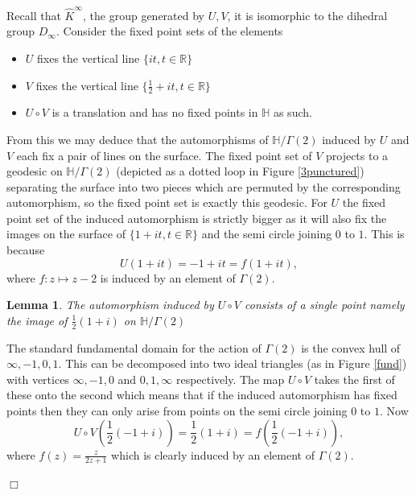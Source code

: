 \documentclass[12pt,a4paper]{amsart}
\newtheorem{lem}[thm]{Lemma}
\def\HH{\mathbb{H}}
\def\xx{\HH/g2}
\def\RR{\mathbb{R}}
\def\g2{\Gamma(2)}
\def\xx{\HH/\g2}
\begin{document}
Recall that  $\hat{K}^\infty$,  the group generated by $U,V$,
it is isomorphic to the dihedral group $D_\infty$.
Consider the fixed point sets of the elements
\begin{itemize}
\item $U$ fixes the  vertical line $\{ it, t \in \RR \} $
\item $V$ fixes the vertical line $\{ \frac{1}{2} +  it , t \in \RR \} $
\item $U\circ V$  is a translation and has no fixed points in $\HH$ as such.
\end{itemize}
From this we may deduce that the automorphisms of $\xx$ induced by $U$ and $V$ 
each fix a pair of lines on the surface. 
The fixed point set of  $V$ projects 
to a geodesic on $\xx$ (depicted as a dotted loop in Figure \ref{3punctured})
separating the surface
 into  two pieces which are permuted by 
the corresponding automorphism,
so the fixed point set is exactly this geodesic.
For $U$ the fixed point set of the induced automorphism  is strictly bigger 
as it will also fix  the images on the surface of 
$\{1+  it, t \in \RR \} $ and the semi circle joining $0$ to $1$.
This is because 
$$U(1+  it) = - 1+  it = f(1+  it),$$
where $f: z \mapsto z - 2$ is induced by an element of $\g2$.


\begin{lem}
The automorphism induced by $U\circ V$ consists of a single point
namely the image of $\frac{1}{2 }(1+ i)$ on $\xx$
\end{lem}

\proof The standard  fundamental domain for the action of $\g2$ 
is the convex hull of $\infty, -1, 0 , 1$.
This can be decomposed into two ideal triangles (as in Figure \ref{fund})
with vertices $\infty, -1, 0 $ and $ 0 , 1,\infty$ respectively.
The map  $U\circ V$ takes the first of these onto the second
which means that
if the induced automorphism has fixed points then 
they can only arise from points on the semi circle joining $0$ to $1$.
Now
$$U\circ V \left(\frac{1}{2 }(-1+ i) \right)  = \frac{1}{2 }(1+ i) = f \left(\frac{1}{2 }(-1+ i) \right),$$
where $f(z) = \frac{z}{2z + 1}$ which  is clearly induced by an element of $\g2$.

\hfill $\Box$

%
\end{document}

